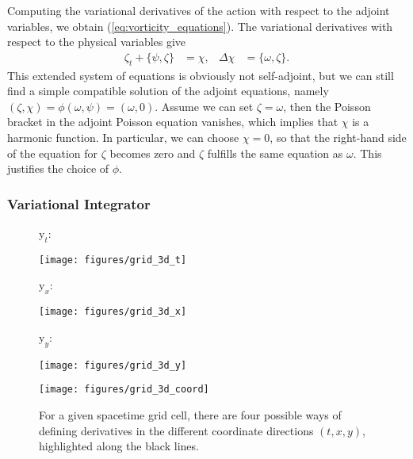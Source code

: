 \documentclass[12pt,a4paper,reqno]{article}
\begin{document}
Computing the variational derivatives of the action with respect to the adjoint variables, we obtain (\ref{eq:vorticity_equations}). The variational derivatives with respect to the physical variables give
\begin{align}
\zeta_{\ensuremath{{\ensuremath{{t}}}}} + \{ \psi , \zeta \} &= \chi , &
\Delta \chi &= \{ \omega , \zeta \} .
\end{align}
This extended system of equations is obviously not self-adjoint, but we can still find a simple compatible solution of the adjoint equations, namely $(\zeta, \chi) = \phi(\omega, \psi) = (\omega, 0)$.
Assume we can set $\zeta = \omega$, then the Poisson bracket in the adjoint Poisson equation vanishes, which implies that $\chi$ is a harmonic function. In particular, we can choose $\chi = 0$, so that the right-hand side of the equation for $\zeta$ becomes zero and $\zeta$ fulfills the same equation as $\omega$. This justifies the choice of $\phi$.

\subsubsection{Variational Integrator}

\begin{figure}[tb]
	\centering
\begin{minipage}[c]{.06\textwidth}
${\ensuremath{{\ensuremath{\mathrm{{y}}}}}}_{\ensuremath{{\ensuremath{{t}}}}}$:
\end{minipage}
\begin{minipage}[c]{.22\textwidth}
\texttt{[image: figures/grid\_3d\_t]}
\end{minipage}
\begin{minipage}[c]{.06\textwidth}
${\ensuremath{{\ensuremath{\mathrm{{y}}}}}}_{\ensuremath{{\ensuremath{{x}}}}}$:
\end{minipage}
\begin{minipage}[c]{.22\textwidth}
\texttt{[image: figures/grid\_3d\_x]}
\end{minipage}
\begin{minipage}[c]{.06\textwidth}
${\ensuremath{{\ensuremath{\mathrm{{y}}}}}}_{\ensuremath{{\ensuremath{{y}}}}}$:
\end{minipage}
\begin{minipage}[c]{.22\textwidth}
\texttt{[image: figures/grid\_3d\_y]}
\end{minipage}
\begin{minipage}[c]{.10\textwidth}
\texttt{[image: figures/grid\_3d\_coord]}
\end{minipage}

	\caption{For a given spacetime grid cell, there are four possible ways of defining derivatives in the different coordinate directions $({\ensuremath{{\ensuremath{{t}}}}}, {\ensuremath{{\ensuremath{{x}}}}}, {\ensuremath{{\ensuremath{{y}}}}})$, highlighted along the black lines.}
	\label{fig:vorticity_derivatives}
\end{figure}
\end{document}
